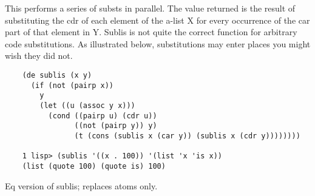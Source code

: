 {    This performs  a  series  of  substs  in  parallel.      The
    value  returned  is  the  result of  substituting the cdr of
    each  element of the a-list  X for every  occurrence of  the
    car  part    of  that element in Y.  Sublis is not quite the
    correct function  for  arbitrary  code  substitutions.    As
    illustrated  below, substitutions may enter places you might
    wish they did not.
}
\begin{verbatim}
    (de sublis (x y)
      (if (not (pairp x))
        y
        (let ((u (assoc y x)))
          (cond ((pairp u) (cdr u))
                ((not (pairp y)) y)
                (t (cons (sublis x (car y)) (sublis x (cdr y))))))))

    1 lisp> (sublis '((x . 100)) '(list 'x 'is x))
    (list (quote 100) (quote is) 100)
\end{verbatim}

{    Eq version of sublis;  replaces atoms only.
}
